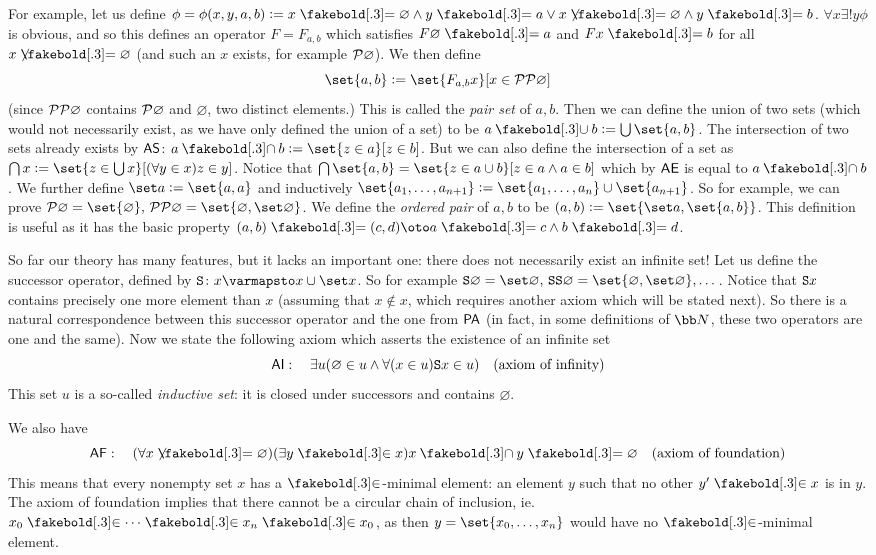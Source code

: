 For example, let us define $\phi=\phi(x,y,a,b)\coloneqq x\eq\varnothing\land y\eq a\lor x\neqb\varnothing\land y\eq b$.
$\forall x\exists!y\phi$ is obvious, and so this defines an operator $F=F_{a,b}$ which satisfies $F\varnothing\eq a$ and $Fx\eq b$ for all $x\neqb\varnothing$ (and such an $x$ exists, for example
${\cal P}\varnothing$).
We then define
$$ \set{a,b} \coloneqq \set{F_{a,b}x}[x\in{\cal PP}\varnothing] $$
(since ${\cal PP}\varnothing$ contains ${\cal P}\varnothing$ and $\varnothing$, two distinct elements.)
This is called the {\it pair set} of $a,b$.
Then we can define the union of two sets (which would not necessarily exist, as we have only defined the union of a set) to be $a\cupb b\coloneqq\bigcup\set{a,b}$.
The intersection of two sets already exists by ${\sf AS}$: $a\capb b\coloneqq\set{z\in a}[z\in b]$.
But we can also define the intersection of a set as $\bigcap x\coloneqq\set{z\in\bigcup x}[(\forall y\in x)z\in y]$.
Notice that $\bigcap\set{a,b}=\set{z\in a\cup b}[z\in a\land a\in b]$ which by ${\sf AE}$ is equal to $a\capb b$.
We further define $\set a\coloneqq\set{a,a}$ and inductively $\set{a_1,\dots,a_{n+1}}\coloneqq\set{a_1,\dots,a_n}\cup\set{a_{n+1}}$.
So for example, we can prove ${\cal P}\varnothing=\set{\varnothing},\,{\cal PP}\varnothing=\set{\varnothing,\set\varnothing}$.
We define the {\it ordered pair} of $a,b$ to be $(a,b)\coloneqq\set{\set a,\set{a,b}}$.
This definition is useful as it has the basic property $(a,b)\eq(c,d)\oto a\eq c\land b\eq d$.

So far our theory has many features, but it lacks an important one: there does not necessarily exist an infinite set!
Let us define the successor operator, defined by ${\tt S}\colon x\varmapsto x\cup\set x$.
So for example ${\tt S}\varnothing=\set\varnothing,\,{\tt SS}\varnothing=\set{\varnothing,\set\varnothing},\dots$.
Notice that ${\tt S}x$ contains precisely one more element than $x$ (assuming that $x\notin x$, which requires another axiom which will be stated next).
So there is a natural correspondence between this successor operator and the one from ${\sf PA}$ (in fact, in some definitions of ${\bb N}$, these two operators are one and the same).
Now we state the following axiom which asserts the existence of an infinite set
$$ {\sf AI}:\quad \exists u(\varnothing\in u\land\forall(x\in u){\tt S}x\in u)\quad (\hbox{axiom of infinity}) $$
This set $u$ is a so-called {\it inductive set}: it is closed under successors and contains $\varnothing$.

We also have
$$ {\sf AF}:\quad (\forall x\neqb\varnothing)(\exists y\inb x)x\capb y\eq\varnothing\quad (\hbox{axiom of foundation}) $$
This means that every nonempty set $x$ has a $\inb$-minimal element: an element $y$ such that no other $y'\inb x$ is in $y$.
The axiom of foundation implies that there cannot be a circular chain of inclusion, ie. $x_0\inb\cdots\inb x_n\inb x_0$, as then $y=\set{x_0,\dots,x_n}$ would have no $\inb$-minimal element.

